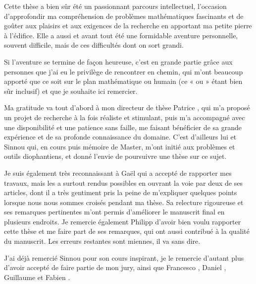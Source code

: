 
\let\chapter\chapter %

Cette thèse a bien sûr été un passionnant parcours intellectuel, l'occasion
d'approfondir ma compréhension de problèmes mathématiques fascinants et de
goûter aux plaisirs et aux exigences de la recherche en apportant ma petite
pierre à l'édifice. Elle a aussi et avant tout été une formidable
aventure personnelle, souvent difficile, mais de ces difficultés dont on sort
grandi.

Si l'aventure se termine de façon heureuse, c'est en grande partie grâce aux
personnes que j'ai eu le privilège de rencontrer en chemin, qui m'ont beaucoup
apporté que ce soit sur le plan mathématique ou humain (ce « ou » étant bien
sûr inclusif) et que je souhaite ici remercier.

\medskip

Ma gratitude va tout d'abord à mon directeur de thèse Patrice ,
qui m'a proposé un projet de recherche à la fois réaliste et stimulant, puis
m'a accompagné avec une disponibilité et une patience sans faille, me faisant
bénéficier de sa grande expérience et de sa profonde connaissance du domaine.
C'est d'ailleurs lui et Sinnou  qui, en cours puis mémoire de
Master, m'ont initié aux problèmes et outils diophantiens, et donné l'envie de
poursuivre une thèse sur ce sujet.

Je suis également très reconnaissant à Gaël  qui a accepté de
rapporter mes travaux, mais les a surtout rendus possibles en ouvrant la voie
par deux de ses articles, dont il a très gentiment pris la peine de
m'expliquer quelques points lorsque nous nous sommes croisés pendant ma
thèse. Sa relecture rigoureuse et ses remarques pertinentes m'ont permis
d'améliorer le manuscrit final en plusieurs endroits.
Je remercie également Philipp  d'avoir bien voulu
rapporter cette thèse et me faire part de ses remarques, qui ont aussi
contribué à la qualité du manuscrit. Les erreurs restantes sont miennes, il
va sans dire.

J'ai déjà remercié Sinnou  pour son cours inspirant, je le remercie
d'autant plus d'avoir accepté de faire partie de mon jury, ainsi que Francesco
, Daniel , Guillaume  et Fabien
.

